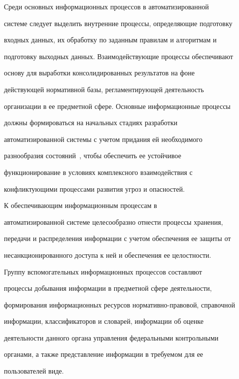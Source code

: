        


       Среди основных информационных процессов в автоматизированной 


системе следует выделить внутренние процессы, определяющие подготовку 


входных данных, их обработку по заданным правилам и алгоритмам и 


подготовку выходных данных. Взаимодействующие процессы обеспечивают 


основу для выработки консолидированных результатов на фоне 


действующей нормативной базы, регламентирующей деятельность 


организации в ее предметной сфере. Основные информационные процессы 


должны формироваться на начальных стадиях разработки 


автоматизированной системы с учетом придания ей необходимого 


разнообразия состояний~\cite{4-2-4}, чтобы обеспечить ее устойчивое 


функционирование в условиях комплексного взаимодействия с 


конфликтующими процессами развития угроз и опасностей.


       


       К обеспечивающим информационным процессам в 


автоматизированной сис\-те\-ме целесообразно отнести процессы хранения,  


передачи и распределения информации с учетом обеспечения ее защиты от 


несанкционированного доступа к ней и обеспечения ее целостности.  


       


       Группу вспомогательных информационных процессов составляют 


процессы добывания информации в предметной сфере деятельности,  


формирования информационных ресурсов нормативно-правовой, справочной 


информации, классификаторов и словарей, информации об оценке 


деятельности данного органа управления федеральными контрольными 


органами, а также представление информации в требуемом для ее 


пользователей виде.  


